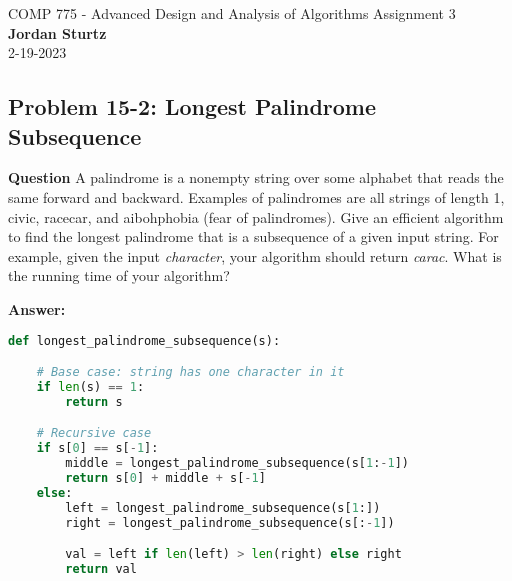 \documentclass[]{book}
\theoremstyle{definition}
\begin{document}
\begin{center}
{\Large COMP 775 - Advanced Design and Analysis of Algorithms \hspace{0.5cm} Assignment 3}\\
\textbf{Jordan Sturtz}\\ %
2-19-2023 %
\end{center}

\vspace{0.2 cm}

\subsection*{Problem 15-2: Longest Palindrome Subsequence}

\textbf{Question} 
A palindrome is a nonempty string over some alphabet that reads the same forward and backward. Examples of palindromes are all strings of length 1, civic, racecar, and aibohphobia (fear of palindromes).
Give an efficient algorithm to find the longest palindrome that is a subsequence of a given input string. For example, given the input \textit{character}, your algorithm should return \textit{carac}. What is the running time of your algorithm?

\textbf{Answer:} 

\begin{lstlisting}[language=Python, caption=Longest Palindrome Subsequence without DP, label=snip:withoutdp]
def longest_palindrome_subsequence(s):

    # Base case: string has one character in it
    if len(s) == 1:
        return s

    # Recursive case
    if s[0] == s[-1]:
        middle = longest_palindrome_subsequence(s[1:-1])
        return s[0] + middle + s[-1]
    else:
        left = longest_palindrome_subsequence(s[1:])
        right = longest_palindrome_subsequence(s[:-1])

        val = left if len(left) > len(right) else right
        return val\end{lstlisting}
\end{document}
